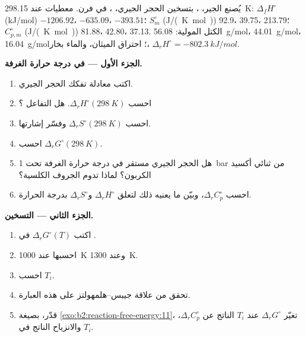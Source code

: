 \begin{problem}
\label{pb:b2:reaction-free-energy:1}
يُصنع الجير، ، بتسخين الحجر الجيري، ، في فرن. معطيات عند
\qty{298.15}{K}: $\Delta_f H^\circ$ (\unit{kJ/mol}) 
$-1206.92$،  $-635.09$،  $-393.51$؛ $S^\circ_m$
(\unit{J/(K.mol)}) 92.9، 39.75، 213.79؛ $C^\circ_{p,m}$ (\unit{J/(K.mol)})
81.88، 42.80، 37.13. الكتل المولية:  \qty{56.08}{g/mol}، 
\qty{44.01}{g/mol}،  \qty{16.04}{g/mol}؛ احتراق الميثان، والماء
بخار، $\Delta_r H^\circ = \qty{-802.3}{kJ/mol}$.

\medskip
\noindent\textbf{الجزء الأول --- في درجة حرارة الغرفة.}
\begin{enumerate}
  \item اكتب معادلة تفكك الحجر الجيري.
  \item احسب $\Delta_r H^\circ(\qty{298}{K})$. هل التفاعل ؟
  \item احسب $\Delta_r S^\circ(\qty{298}{K})$ وفسّر إشارتها.
  \item احسب $\Delta_r G^\circ(\qty{298}{K})$.
  \item هل الحجر الجيري مستقر في درجة حرارة الغرفة تحت \qty{1}{bar} من
        ثنائي أكسيد الكربون؟ لماذا تدوم الجروف الكلسية؟
  \item احسب $\Delta_r C^\circ_p$، وبيّن ما يعنيه ذلك لتعلق
        $\Delta_r H^\circ$ و$\Delta_r S^\circ$ بدرجة الحرارة.
\end{enumerate}

\medskip
\noindent\textbf{الجزء الثاني --- التسخين.}
\begin{enumerate}[resume]
  \item اكتب $\Delta_r G^\circ(T)$ في .
  \item احسبها عند \qty{1000}{K} وعند \qty{1300}{K}.
  \item احسب  $T_i$.
  \item تحقق من علاقة جيبس--هلمهولتز على هذه العبارة.
  \item قدّر، بصيغة \cref{exo:b2:reaction-free-energy:11}،
        تغيّر $\Delta_r G^\circ$ عند $T_i$ الناتج عن
        $\Delta_r C^\circ_p$، والانزياح الناتج في $T_i$.
\end{enumerate}


\end{problem}
